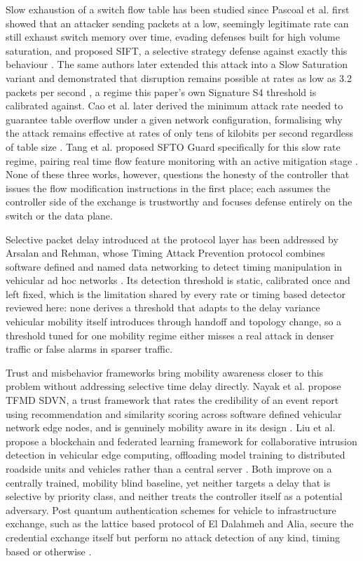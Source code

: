 \documentclass[final,5p,twocolumn]{elsarticle}
\theoremstyle{remark}
\theoremstyle{plain}
\begin{document}
Slow exhaustion of a switch flow table has been studied since Pascoal et al.
first showed that an attacker sending packets at a low, seemingly legitimate
rate can still exhaust switch memory over time, evading defenses built for
high volume saturation, and proposed SIFT, a selective strategy defense
against exactly this behaviour \cite{Pascoal2017}. The same authors later
extended this attack into a Slow Saturation variant and demonstrated that
disruption remains possible at rates as low as 3.2 packets per second
\cite{Pascoal2020DoS}, a regime this paper's own Signature S4 threshold is
calibrated against. Cao et al. later derived
the minimum attack rate needed to guarantee table overflow under a given
network configuration, formalising why the attack remains effective at rates
of only tens of kilobits per second regardless of table size
\cite{Cao2022LOFT}. Tang et al. proposed SFTO Guard specifically for this slow
rate regime, pairing real time flow feature monitoring with an active
mitigation stage \cite{Tang2023SFTOGuard}. None of these three works, however,
questions the honesty of the controller that issues the flow modification
instructions in the first place; each assumes the controller side of the
exchange is trustworthy and focuses defense entirely on the switch or the data
plane.

Selective packet delay introduced at the protocol layer has been addressed by
Arsalan and Rehman, whose Timing Attack Prevention protocol combines software
defined and named data networking to detect timing manipulation in vehicular
ad hoc networks \cite{Arsalan2018}. Its detection threshold is static,
calibrated once and left fixed, which is the limitation shared by every rate
or timing based detector reviewed here: none derives a threshold that adapts
to the delay variance vehicular mobility itself introduces through handoff and
topology change, so a threshold tuned for one mobility regime either misses a
real attack in denser traffic or false alarms in sparser traffic.

Trust and misbehavior frameworks bring mobility awareness closer to this
problem without addressing selective time delay directly. Nayak et al.
propose TFMD SDVN, a trust framework that rates the credibility of an event
report using recommendation and similarity scoring across software defined
vehicular network edge nodes, and is genuinely mobility aware in its design
\cite{Nayak2022}. Liu et al. propose a blockchain and federated learning
framework for collaborative intrusion detection in vehicular edge computing,
offloading model training to distributed roadside units and vehicles rather
than a central server \cite{Liu2021BFLVEC}. Both improve on a centrally
trained, mobility blind baseline, yet neither targets a delay that is
selective by priority class, and neither treats the controller itself as a
potential adversary. Post quantum authentication schemes for vehicle to
infrastructure exchange, such as the lattice based protocol of El Dalahmeh and
Alia, secure the credential exchange itself but perform no attack detection of
any kind, timing based or otherwise \cite{ElDalahmeh2025}.
\end{document}
